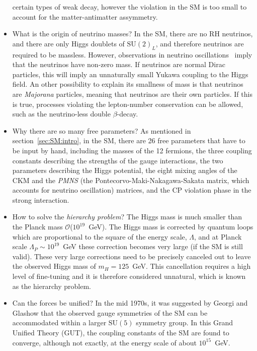 \begin{itemize}
certain types of weak decay, however the violation in the SM is too small to account for the matter-antimatter
assymmetry.
    \item What is the origin of neutrino masses? 
In the SM, there are no RH neutrinos, and 
there are only Higgs doublets of $\text{SU}(2)_L$, and therefore neutrinos are required to be massless. 
However, observations in neutrino oscillations~\cite{neutrino1, neutrino2} 
imply that the neutrinos have non-zero mass. If neutrinos are normal Dirac 
particles, this will imply an unnaturally small Yukawa coupling to the Higgs field. An other possibility 
to explain its smallness of mass is that neutrinos are \textit{Majorana} particles, 
meaning that neutrinos are their own particles. If this is true, 
processes violating the lepton-number conservation can be allowed, such as the neutrino-less double $\beta$-decay.
    \item Why there are so many free parameters?
As mentioned in section~\ref{sec:SM:intro}, in the SM, there are 26 free parameters 
that have to be input by hand, including the masses of the 12 fermions, the three coupling constants describing the strengths
of the gauge interactions, the two parameters describing the Higgs potential, the eight mixing angles
of the CKM and the \textit{PMNS} (the Pontecorvo-Maki-Nakagawa-Sakata matrix, which accounts for neutrino oscillation) 
matrices, and the CP violation phase in the strong interaction. 
    \item How to solve the \textit{hierarchy problem}? 
The Higgs mass is much smaller than the 
Planck mass $\mathcal{O}$($10^{19}$~GeV). 
The Higgs mass is corrected by quantum loops which are proportional to the square 
of the energy scale, $\Lambda$, and at Planck scale $\Lambda_P\sim10^{19}$~GeV 
these correction becomes very large (if the SM is still valid).
These very large corrections need to be precisely canceled
out to leave the observed Higgs mass of $m_H = 125$~GeV. 
This cancellation requires a high level of fine-tuning and it is therefore considered unnatural,
which is known as the hierarchy problem.
    \item Can the forces be unified? 
In the mid 1970s, it was suggested by Georgi and Glashow that the observed gauge symmetries
of the SM can be accommodated within a larger $\text{SU}(5)$ symmetry group. 
In this Grand Unified Theory (GUT), the coupling constants of the SM are found to 
converge, although not exactly, at the energy scale of about $10^{15}$~GeV.


\end{itemize}

